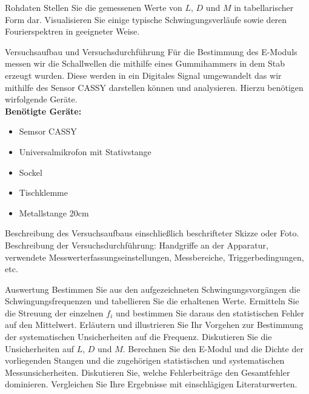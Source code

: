 \documentclass[twoside]{protokoll}
\begin{document}
\begin{aufgabe}{Rohdaten}
  Stellen Sie die gemessenen Werte von $L$, $D$ und $M$ in
  tabellarischer Form dar. Visualisieren Sie einige typische
  Schwingungsverläufe sowie deren Fourierspektren in geeigneter
  Weise.
\end{aufgabe}

\begin{aufgabe}{Versuchsaufbau und Versuchsdurchführung}
  Für die Bestimmung des E-Moduls messen wir die Schallwellen die mithilfe eines Gummihammers in dem Stab erzeugt wurden. Diese werden in ein Digitales Signal umgewandelt das wir mithilfe des Sensor CASSY darstellen können und analysieren. Hierzu benötigen wirfolgende Geräte.\\

\textbf{Benötigte Geräte:}
\begin{itemize}
\item Semsor CASSY
\item Universalmikrofon mit Stativstange
\item Sockel
\item Tischklemme
\item Metallstange 20cm

\end{itemize}
  
  
  
  Beschreibung des Versuchsaufbaus einschließlich beschrifteter Skizze
  oder Foto. Beschreibung der Versuchsdurchführung: Handgriffe an der
  Apparatur, verwendete Messwerterfassungseinstellungen, Messbereiche,
  Triggerbedingungen, etc.
\end{aufgabe}

\begin{aufgabe}{Auswertung}
  Bestimmen Sie aus den aufgezeichneten Schwingungsvorgängen die
  Schwingungsfrequenzen und tabellieren Sie die erhaltenen
  Werte. Ermitteln Sie die Streuung der einzelnen $f_i$ und bestimmen
  Sie daraus den statistischen Fehler auf den Mittelwert. Erläutern
  und illustrieren Sie Ihr Vorgehen zur Bestimmung der systematischen
  Unsicherheiten auf die Frequenz. Diskutieren Sie die Unsicherheiten
  auf $L$, $D$ und $M$. Berechnen Sie den E-Modul und die Dichte der
  vorliegenden Stangen und die zugehörigen statistischen und
  systematischen Messunsicherheiten. Diskutieren Sie, welche
  Fehlerbeiträge den Gesamtfehler dominieren. Vergleichen Sie Ihre
  Ergebnisse mit einschlägigen Literaturwerten.
\end{aufgabe}
 
\end{document}
